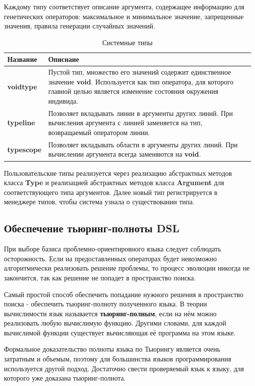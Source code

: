 \documentclass[russian,utf8,emptystyle]{eskdtext}
\begin{document}
\begin{spacing}{1.5}
Каждому типу соответствует описание аргумента, содержащее информацию для генетических операторов: максимальное и минимальное значение, запрещенные значения, правила генерации случайных значений.

\begin{table}
\centering
\caption{Системные типы}
\label{tab:system_types}
\begin{tabularx}{\textwidth}{X|X}
Название & Описнаие \\ 
\hline 
\textbf{voidtype} & Пустой тип, множество его значений содержит единственное значение \textbf{void}. Используется как тип оператора, для которого главной целью является изменение состояния окружения индивида. \\ \hline
\textbf{typeline} & Позволяет вкладывать линии в аргументы других линий. При вычисления аргумента с линией заменяется на тип, возвращаемый оператором линии. \\ \hline
\textbf{typescope} & Позволяет вкладывать области в аргументы других линий. При вычислении аргумента всегда заменяются на \textbf{void}. 
\end{tabularx} 
\end{table}

Пользовательские типы реализуется через реализацию абстрактных методов класса \textbf{Type} и реализацией абстрактных методов класса \textbf{Argument} для соответствующего типа аргументов. Далее новый тип регистрируется в менеджере типов, чтобы система узнала о существовании типа.

\subsection{Обеспечение тьюринг-полноты DSL}
При выборе базиса проблемно-ориентировного языка следует соблюдать осторожность. Если на предоставленных операторах будет невозможно алгоритмически реализовать решение проблемы, то процесс эволюции никогда не закончится, так как решение не попадет в пространство поиска.

Самый простой способ обеспечить попадание нужного решения в пространство поиска - обеспечить тьюринг-полноту полученного языка. В теории вычислимости язык называется \textbf{тьюринг-полным}, если на нём можно реализовать любую вычислимую функцию. Другими словами, для каждой вычислимой функции существует вычисляющая её программа на этом языке.

Формальное доказательство полноты языка по Тьюрингу является очень затратным и объемым, поэтому для большинства языков программирования используется другой подход. Достаточно свести проверяемый язык к языку, для которого уже доказана тьюринг-полнота.


\end{spacing}
\end{document}
